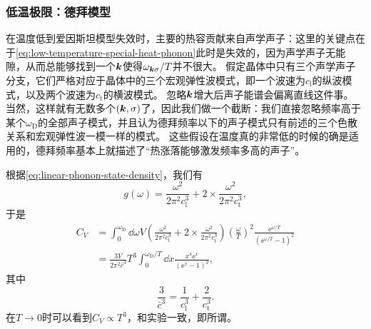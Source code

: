 \subsubsection{低温极限：德拜模型} 

在温度低到爱因斯坦模型失效时，主要的热容贡献来自声学声子：这里的关键点在于\eqref{eq:low-temperature-special-heat-phonon}此时是失效的，因为声学声子无能隙，从而总能够找到一个$\vb*{k}$使得$\omega_{\vb*{k} \sigma} / T$并不很大。
假定晶体中只有三个声学声子分支，它们严格对应于晶体中的三个宏观弹性波模式，即一个波速为$c_\text{l}$的纵波模式，以及两个波速为$c_\text{t}$的横波模式。
忽略$\vb*{k}$增大后声子能谱会偏离直线这件事。
当然，这样就有无数多个$(\vb*{k}, \sigma)$了，因此我们做一个截断：我们直接忽略频率高于某个$\omega_\text{D}$的全部声子模式，并且认为德拜频率以下的声子模式只有前述的三个色散关系和宏观弹性波一模一样的模式。
这些假设在温度真的非常低的时候的确是适用的，德拜频率基本上就描述了“热涨落能够激发频率多高的声子”。

根据\eqref{eq:linear-phonon-state-density}，我们有
\begin{equation}
    g(\omega) = \frac{\omega^2}{2\pi^2 c_\text{l}^3} + 2 \times \frac{\omega^2}{2\pi^2 c_\text{t}^3},
\end{equation}
于是
\begin{equation}
    \begin{aligned}
        C_V &= \int_0^{\omega_\text{D}} \dd{\omega} V \left( \frac{\omega^2}{2\pi^2 c_\text{l}^3} + 2 \times \frac{\omega^2}{2\pi^2 c_\text{t}^3} \right) \left( \frac{\omega}{T} \right)^2 \frac{\ee^{\omega / T}}{(\ee^{\omega / T} - 1)^2} \\
        &= \frac{3V}{2\pi^2 \bar{c}^3} T^3 \int_0^{\omega_\text{D} / T} \dd{x} \frac{x^4 \ee^{x}}{(\ee^x - 1)^2} ,
    \end{aligned}
    \label{eq:debye-special-heat}
\end{equation}
其中
\begin{equation}
    \frac{3}{\bar{c}^3} = \frac{1}{c_\text{l}^3} + \frac{2}{c_\text{t}^3}.
\end{equation}
在$T \to 0$时可以看到$C_V \propto T^3$，和实验一致，即所谓。


